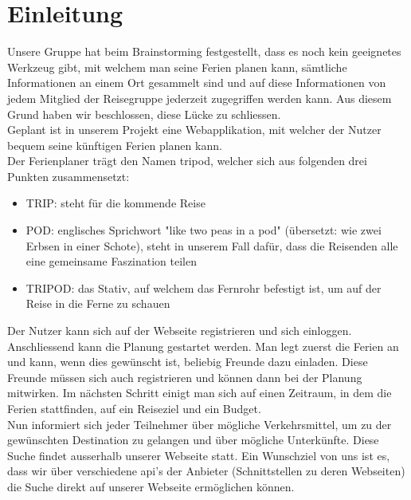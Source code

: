 \documentclass[10pt,a4paper,titlepage,twoside,german,final]{zhawreprt}
\numberwithin{table}{chapter}
\begin{document}

\tableofcontents

\chapter{Einleitung}\label{chp:Introduction}
Unsere Gruppe hat beim Brainstorming festgestellt, dass es noch kein geeignetes Werkzeug gibt, mit welchem man seine Ferien planen kann, sämtliche Informationen an einem Ort gesammelt sind und auf diese Informationen von jedem Mitglied der Reisegruppe jederzeit zugegriffen werden kann. Aus diesem Grund haben wir beschlossen, diese Lücke zu schliessen.\\
Geplant ist in unserem Projekt eine Webapplikation, mit welcher der Nutzer bequem seine künftigen Ferien planen kann.\\
Der Ferienplaner trägt den Namen \gls{tripod}, welcher sich aus folgenden drei Punkten zusammensetzt:
\begin{itemize}
\item TRIP: steht für die kommende Reise
\item POD: englisches Sprichwort "like two peas in a pod" (übersetzt: wie zwei Erbsen in einer Schote), steht in unserem Fall dafür, dass die Reisenden alle eine gemeinsame Faszination teilen
\item TRIPOD: das Stativ, auf welchem das Fernrohr befestigt ist, um auf der Reise in die Ferne zu schauen
\end{itemize}
Der Nutzer kann sich auf der Webseite registrieren und sich einloggen. Anschliessend kann die Planung gestartet werden. Man legt zuerst die Ferien an und kann, wenn dies gewünscht ist, beliebig Freunde dazu einladen. Diese Freunde müssen sich auch registrieren und können dann bei der Planung mitwirken. Im nächsten Schritt einigt man sich auf einen Zeitraum, in dem die Ferien stattfinden, auf ein Reiseziel und ein Budget.\\
Nun informiert sich jeder Teilnehmer über mögliche Verkehrsmittel, um zu der gewünschten Destination zu gelangen und über mögliche Unterkünfte. Diese Suche findet ausserhalb unserer Webseite statt. Ein Wunschziel von uns ist es, dass wir über verschiedene \gls{api}'s der Anbieter (Schnittstellen zu deren Webseiten) die Suche direkt auf unserer Webseite ermöglichen können.\\
\end{document}
